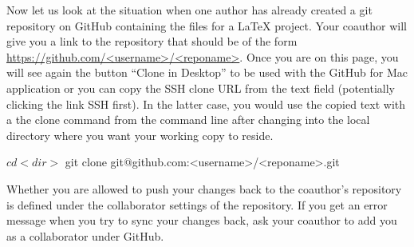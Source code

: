 Now let us look at the situation when one author has already created a git repository on GitHub containing the files for a LaTeX project.  Your coauthor will give you a link to the repository that should be of the form \url{https://github.com/<username>/<reponame>}.  Once you are on this page, you will see again the button ``Clone in Desktop'' to be used with the GitHub for Mac application or you can copy the SSH clone URL from the text field (potentially clicking the link SSH first).  In the latter case, you would use the copied text with a the clone command from the command line after changing into the local directory where you want your working copy to reside.

\begin{CodeVerbatim}
$ cd <dir>
$ git clone git@github.com:<username>/<reponame>.git
\end{CodeVerbatim}

Whether you are allowed to push your changes back to the coauthor's repository is defined under the collaborator settings of the repository.  If you get an error message when you try to sync your changes back, ask your coauthor to add you as a collaborator under GitHub.
